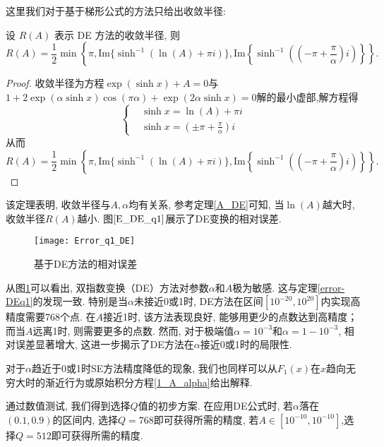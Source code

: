这里我们对于基于梯形公式的方法只给出收敛半径: 
\begin{theorem}\label{error-DEq1}
	设 \( R(A) \) 表示 DE 方法的收敛半径, 则
	\begin{equation}
		R(A)=\frac{1}{2}\min\left\{\pi,\text{Im}\{\sinh^{-1}(\ln(A)+\pi i)\},\text{Im}\left\{\sinh^{-1}\left(\left(-\pi+\frac{\pi}{\alpha}\right)i\right)\right\}\right\}.
	\end{equation}
\end{theorem}
\begin{proof}	
	收敛半径为方程\(\exp(\sinh x)+A=0\)与\(1+2 \exp({\alpha \sinh x})\cos(\pi\alpha)+\exp({2\alpha \sinh x})=0\)解的最小虚部,解方程得
	\begin{equation}\left\{
		\begin{aligned}
			&\sinh x=\ln(A)+\pi i\\
			&\sinh x=\left(\pm\pi+\frac{\pi}{\alpha}\right)i
		\end{aligned}\right.
	\end{equation}
	从而
	\begin{equation}
		R(A)=\frac{1}{2}\min\left\{\pi,\text{Im}\{\sinh^{-1}(\ln(A)+\pi i)\},\text{Im}\left\{\sinh^{-1}\left(\left(-\pi+\frac{\pi}{\alpha}\right)i\right)\right\}\right\}.
	\end{equation}
\end{proof}
该定理表明, 收敛半径与\(A,\alpha\)均有关系, 参考定理\ref{A_DE}可知, 当\(\ln(A)\)越大时, 收敛半径\(R(A)\)越小. 
图$\ref{E_DE_q1}$展示了DE变换的相对误差. 
\begin{figure}[htbp]
	\centering
	\texttt{[image: Error\_q1\_DE]}
	\caption{基于DE方法的相对误差}
	\label{E_DE_q1}
\end{figure}

从图\ref{E_DE_q1}可以看出, 双指数变换（DE）方法对参数\( \alpha \)和\( A \)极为敏感. 这与定理\ref{error-DEq1}的发现一致. 特别是当\( \alpha \)未接近0或1时, DE方法在区间$[10^{-20}, 10^{20}]$内实现高精度需要768个点. 在\( A \)接近1时, 该方法表现良好, 能够用更少的点数达到高精度；而当\( A \)远离1时, 则需要更多的点数. 然而, 对于极端值\( \alpha=10^{-3} \)和\( \alpha=1-10^{-3} \), 相对误差显著增大, 这进一步揭示了DE方法在\( \alpha \)接近0或1时的局限性. 


对于$\alpha$趋近于0或1时SE方法精度降低的现象, 我们也同样可以从$F_1(x)$在$x$趋向无穷大时的渐近行为或原始积分方程\eqref{1_A_alpha}给出解释. 

通过数值测试, 我们得到选择$Q$值的初步方案. 在应用DE公式时, 若$\alpha$落在$(0.1,0.9)$的区间内, 选择$Q=768$即可获得所需的精度, 若$A \in[10^{-10},10^{-10}]$,选择$Q=512$即可获得所需的精度.


